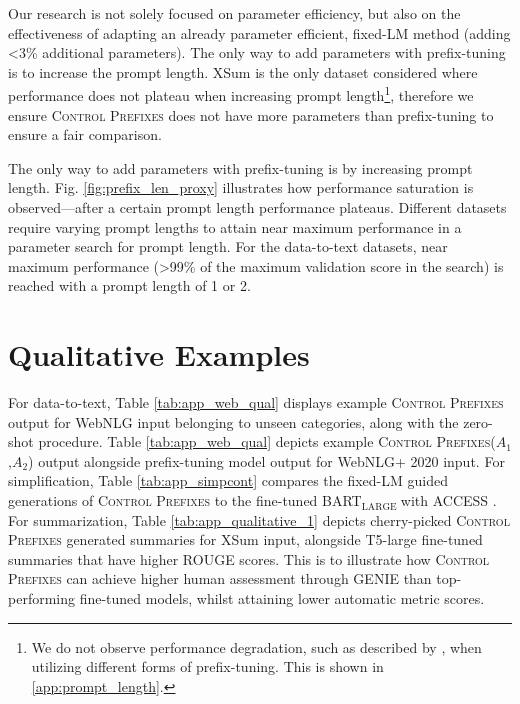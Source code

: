 \documentclass[11pt]{article}
\newcommand{\control}{\textsc{Control Prefixes}\xspace}
\newcommand{\bartl}{BART$_{\text {LARGE }}$}
\begin{document}
\FloatBarrier


Our research is not solely focused on parameter efficiency, but also on the effectiveness of adapting an already parameter efficient, fixed-LM method (adding <3\% additional parameters). The only way to add parameters with prefix-tuning is to increase the prompt length. XSum is the only dataset considered where performance does not plateau when increasing prompt length\footnote{We do not observe performance degradation, such as described by \citet{lora}, when utilizing different forms of prefix-tuning. This is shown in  \ref{app:prompt_length}.}, therefore we ensure \control does not have more parameters than prefix-tuning to ensure a fair comparison. 

The only way to add parameters with prefix-tuning is by increasing prompt length. Fig. \ref{fig:prefix_len_proxy} illustrates how performance saturation is observed—after a certain prompt length performance plateaus. Different datasets require varying prompt lengths to attain near maximum performance in a parameter search for prompt length. For the data-to-text datasets, near maximum performance (>99\% of the maximum validation score in the search) is reached with a prompt length of 1 or 2. 

\section{Qualitative Examples}
\label{app:qual}
For data-to-text, Table \ref{tab:app_web_qual} displays example \control output for WebNLG input belonging to unseen categories, along with the zero-shot procedure. Table \ref{tab:app_web_qual} depicts example \control ($A_{1}$,$A_{2}$) output alongside prefix-tuning model output for WebNLG+ 2020 input. For simplification, Table \ref{tab:app_simpcont} compares the fixed-LM guided generations of \control to the fine-tuned \bartl with ACCESS \citep{MUSS}. For summarization, Table \ref{tab:app_qualitative_1} depicts cherry-picked \control generated summaries for XSum input, alongside T5-large fine-tuned summaries that have higher ROUGE scores. This is to illustrate how \control can achieve higher human assessment through GENIE than top-performing fine-tuned models, whilst attaining lower automatic metric scores.






\FloatBarrier
\end{document}
